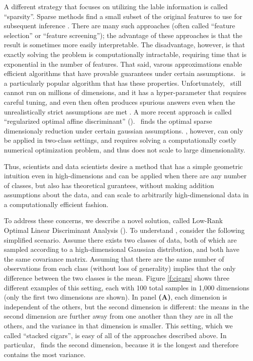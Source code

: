 \documentclass[10pt]{article}
\begin{document}
A different strategy that focuses on utilizing the lable information is called  ``sparsity''. Sparse methods  find a small subset of the original features to use for subsequent inference \cite{sparsity}. There are many such approaches (often called ``feature selection'' or ``feature screening''); the advantage of these approaches is that the result is sometimes more easily interpretable.  The disadvantage, however, is that exactly solving the problem is computationally intractable, requiring time that is exponential in the number of features.  That said, varous approximations enable efficient algorithms that have provable guarantees under certain assumptions.  \Lasso~is a particularly popular algorithm that has these properties. Unfortunately, \Lasso~still cannot run on millions of dimensions, and it has a hyper-parameter that requires careful tuning, and even then often produces spurious answers even when the unrealistically strict assumptions are met \cite{lasso-fail}.
A more recent approach is called ``regularized optimal affine discriminant'' (\Road). \Road~finds the optimal sparse dimensionaly reduction under certain gaussian assumptions.  \Road, however, can only be applied in two-class settings, and requires solving a computationally costly numerical optimization problem, and thus does not scale to large dimensionality.


Thus, scientists and data scientists desire a method that has a simple geometric intuition even in high-dimensions and can be applied when there are any number of classes, but also has theoretical gurantees, without making addition assumptions about the data, and can scale to arbitrarily high-dimensional data in a computationally efficient fashion. 

To address these concerns,  we describe a novel solution, called Low-Rank Optimal Linear Discriminant Analysis (\Lol). To understand \Lol, consider the following simplified scenario.  Assume there exists two classes of data, both of which are sampled according to a high-dimensional Gaussian distribution, and both have the same covariance matrix.  Assuming that there are the same number of observations from each class (without loss of generality) implies that the only difference between the two classes is the mean.  Figure \ref{f:cigars} shows three different examples of this setting, each with 100 total samples in 1,000 dimensions (only the first two dimensions are shown).  In panel \textbf{(A)}, each dimension is independent of the others, but the second dimension is different: the means in the second dimension are further away from one another than they are in all the others, and the variance in that dimension is smaller.  This setting, which we called ``stacked cigars'', is easy of all of the approaches described above.
In particular, \Pca~finds the second dimension, because it is the longest and therefore contains the most variance.  \Rrla
\end{document}
